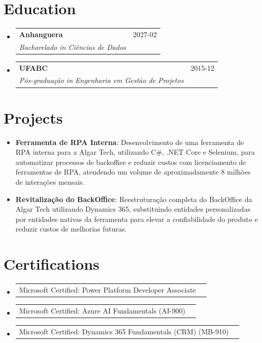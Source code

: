 \documentclass[a4paper,11pt]{article}
\makeatletter
\newcommand{\resumeItem}[1]{
  \item\small{
    {#1 \vspace{-2pt}}
  }
}
\newcommand{\resumeSubheading}[4]{
  \vspace{-1pt}\item
  \begin{tabular*}{0.97\textwidth}{l@{\extracolsep{\fill}}r}
    \textbf{#1} & #2 \\
    \textit{\small#3} & \textit{\small #4} \\
  \end{tabular*}\vspace{-5pt}
}
\newcommand{\resumeCertification}[2]{%
  \item
  \begin{tabular*}{0.97\textwidth}{@{}l@{\extracolsep{\fill}}r@{}}
    #1 & \text{#2} \\
  \end{tabular*}\vspace{-4pt}
}
\newcommand{\resumeSubItem}[2]{\resumeItem{#1: #2}\vspace{-4pt}}
\newcommand{\resumeSubHeadingListStart}{\begin{itemize}[leftmargin=0em, itemindent=0em, label={}, itemsep=0ex]}
\newcommand{\resumeSubHeadingListEnd}{\end{itemize}}
\makeatother
\begin{document}
\section{Education}
\resumeSubHeadingListStart

\resumeSubheading
{Anhanguera}{2027-02}
{Bacharelado in Ciências de Dados}{}

\resumeSubheading
{UFABC}{2015-12}
{Pós-graduação in Engenharia em Gestão de Projetos}{}
\resumeSubHeadingListEnd

\section{Projects}
\resumeSubHeadingListStart
\resumeSubItem{\textbf{Ferramenta de RPA Interna}}{Desenvolvimento de uma ferramenta de RPA interna para a Algar Tech, utilizando C\#, .NET Core e Selenium, para automatizar processos de backoffice e reduzir custos com licenciamento de ferramentas de RPA, atendendo um volume de aproximadamente 8 milhões de interações mensais.}
\resumeSubItem{\textbf{Revitalização do BackOffice}}{Reestruturação completa do BackOffice da Algar Tech utilizando Dynamics 365, substituindo entidades personalizadas por entidades nativas da ferramenta para elevar a confiabilidade do produto e reduzir custos de melhorias futuras.}
\resumeSubHeadingListEnd

\section{Certifications}
\resumeSubHeadingListStart
\resumeCertification{Microsoft Certified: Power Platform Developer Associate}{2025-12}{}{}
\resumeCertification{Microsoft Certified: Azure AI Fundamentals (AI-900)}{2025-12}{}{}
\resumeCertification{Microsoft Certified: Dynamics 365 Fundamentals (CRM) (MB-910)}{2023-12}{}{}
\resumeSubHeadingListEnd
\end{document}
